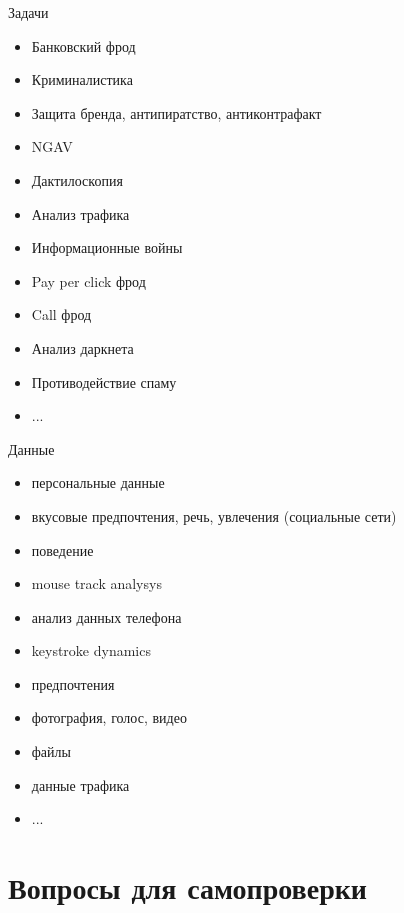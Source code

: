 \documentclass{beamer}
\begin{document}
  \begin{frame}{Задачи}
  \begin{itemize}
  	\item Банковский фрод
  	\item Криминалистика
  	\item Защита бренда, антипиратство, антиконтрафакт
  	\item NGAV
  	\item Дактилоскопия
  	\item Анализ трафика
  	\item Информационные войны
  	\item Pay per click фрод
  	\item Call фрод
  	\item Анализ даркнета
  	\item Противодействие спаму
  	\item ...
  \end{itemize} 
  \end{frame}
 
  \begin{frame}{Данные}
  \begin{itemize}
     \item персональные данные
     \item вкусовые предпочтения, речь, увлечения (социальные сети)
     \item поведение
     \item mouse track analysys 
     \item анализ данных телефона
     \item keystroke dynamics
     \item предпочтения
     \item фотография, голос, видео
     \item файлы
     \item данные трафика
     \item ...
  \end{itemize}
  \end{frame}  


 \section{Вопросы для самопроверки}
  
\end{document}
